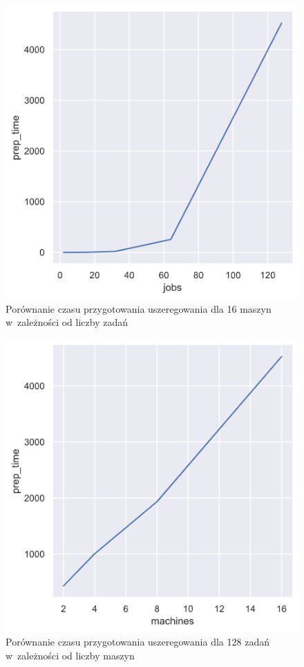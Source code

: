 \documentclass[brudnopis]{xmgr}
\begin{document}
\begin{figure}[!tbh]
\centering
\includegraphics[width=.8\hsize]{fig/relplot_128j.png}
\caption{Porównanie czasu przygotowania uszeregowania dla 16 maszyn w~zależności od liczby zadań\label{diag:relplot_128j}}
\end{figure}\medskip

\begin{figure}[!tbh]
\centering
\includegraphics[width=.8\hsize]{fig/relplot_16m.png}
\caption{Porównanie czasu przygotowania uszeregowania dla 128 zadań w~zależności od liczby maszyn\label{diag:relplot_16m}}
\end{figure}\medskip
\end{document}
